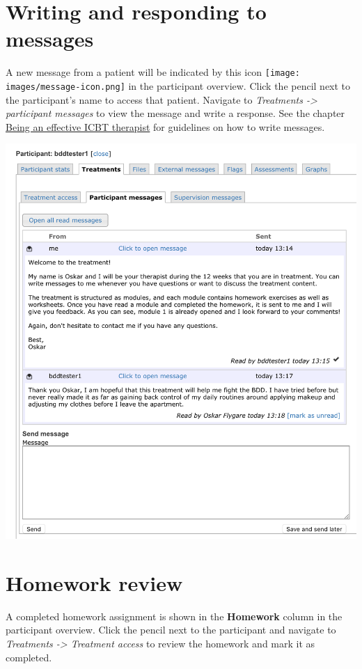 \documentclass[]{book}
\theoremstyle{definition}
\theoremstyle{definition}
\theoremstyle{definition}
\theoremstyle{remark}
\begin{document}
\hypertarget{writing-and-responding-to-messages}{%
\section{Writing and responding to
messages}\label{writing-and-responding-to-messages}}

A new message from a patient will be indicated by this icon
\texttt{[image: images/message-icon.png]} in the participant overview.
Click the pencil next to the participant's name to access that patient.
Navigate to \emph{Treatments -\textgreater{} participant messages} to
view the message and write a response. See the chapter
\protect\hyperlink{being-an-effective-icbt-therapist}{Being an effective
ICBT therapist} for guidelines on how to write messages.

\includegraphics{images/therapist-messages.png}

\hypertarget{homework-review}{%
\section{Homework review}\label{homework-review}}

A completed homework assignment is shown in the \textbf{Homework} column
in the participant overview. Click the pencil next to the participant
and navigate to \emph{Treatments -\textgreater{} Treatment access} to
review the homework and mark it as completed.
\end{document}
